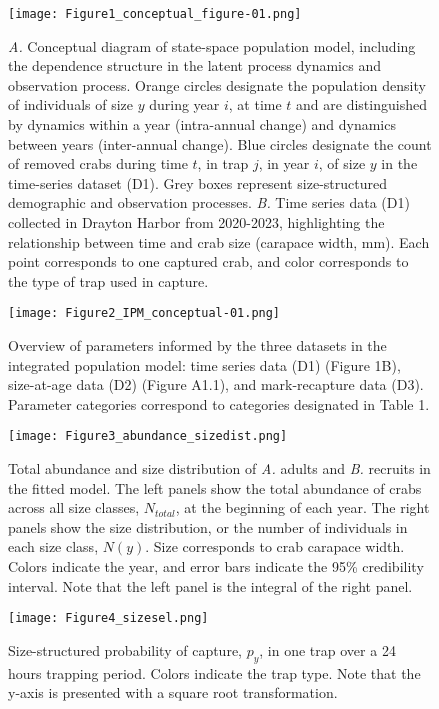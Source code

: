 \documentclass{article}
\begin{document}
\begin{figure}[H]
    \centering
    \texttt{[image: Figure1\_conceptual\_figure-01.png]}
    \caption{\textit{A.} Conceptual diagram of state-space population model, including the dependence structure in the latent process dynamics and observation process. Orange circles designate the population density of individuals of size $y$ during year $i$, at time $t$ and are distinguished by dynamics within a year (intra-annual change) and dynamics between years (inter-annual change). Blue circles designate the count of removed crabs during time $t$, in trap $j$, in year $i$, of size $y$ in the time-series dataset (D1). Grey boxes represent size-structured demographic and observation processes. \textit{B.} Time series data (D1) collected in Drayton Harbor from 2020-2023, highlighting the relationship between time and crab size (carapace width, mm). Each point corresponds to one captured crab, and color corresponds to the type of trap used in capture.}
\end{figure}

\begin{figure}[H]
    \centering
    \texttt{[image: Figure2\_IPM\_conceptual-01.png]}
    \caption{Overview of parameters informed by the three datasets in the integrated population model: time series data (D1) (Figure 1B), size-at-age data (D2) (Figure A1.1), and mark-recapture data (D3). Parameter categories correspond to categories designated in Table 1.}
\end{figure}

\begin{figure}[H]
    \centering
    \texttt{[image: Figure3\_abundance\_sizedist.png]}
    \caption{Total abundance and size distribution of \textit{A.} adults and \textit{B.} recruits in the fitted model. The left panels show the total abundance of crabs across all size classes, $N_{total}$, at the beginning of each year. The right panels show the size distribution, or the number of individuals in each size class, $N(y)$. Size corresponds to crab carapace width. Colors indicate the year, and error bars indicate the 95\% credibility interval. Note that the left panel is the integral of the right panel.}
\end{figure}

\begin{figure}[H]
    \centering
    \texttt{[image: Figure4\_sizesel.png]}
    \caption{Size-structured probability of capture, $p_{y}$, in one trap over a 24 hours trapping period. Colors indicate the trap type. Note that the y-axis is presented with a square root transformation.}
\end{figure}
\end{document}
